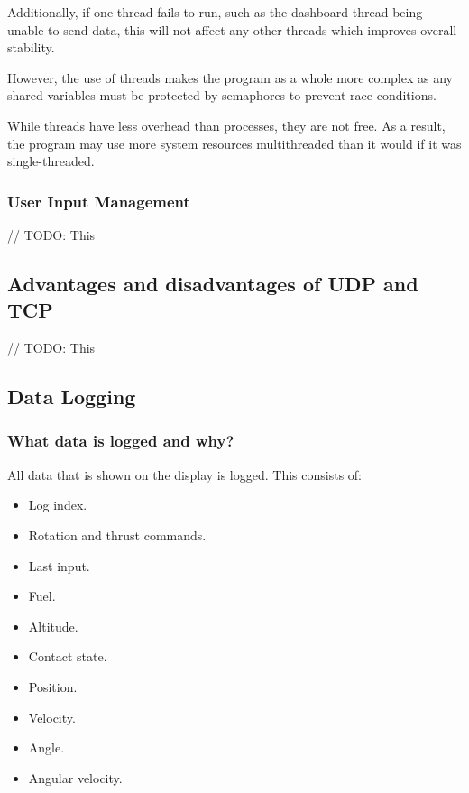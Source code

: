 \documentclass{article}
\begin{document}
{        Additionally, if one thread fails to run, such as the dashboard thread being unable to send data,
        this will not affect any other threads which improves overall stability.

        However, the use of threads makes the program as a whole more complex as any shared variables
        must be protected by semaphores to prevent race conditions.

        While threads have less overhead than processes, they are not free. As a result, the program may
        use more system resources multithreaded than it would if it was single-threaded.

        \subsubsection{User Input Management}

        // TODO: This

    \subsection{Advantages and disadvantages of UDP and TCP}
    // TODO: This

    \subsection{Data Logging}

        \subsubsection{What data is logged and why?}
        All data that is shown on the display is logged. This consists of:
        \begin{itemize}
            \item Log index.
            \item Rotation and thrust commands.
            \item Last input.
            \item Fuel.
            \item Altitude.
            \item Contact state.
            \item Position.
            \item Velocity.
            \item Angle.
            \item Angular velocity.
        \end{itemize}

}
\end{document}
